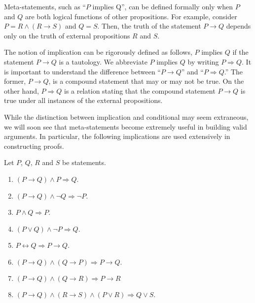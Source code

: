 Meta-statements, such as ``$P$ implies Q'', can be defined formally only when $P$ and $Q$ are both logical functions of other propositions.
For example, consider $P=R \wedge (R \to S)$ and $Q=S$.
Then, the truth of the statement $P \to Q$ depends only on the truth of external propositions $R$ and $S$.

The notion of implication can be rigorously defined as follows, $P$ implies $Q$ if the statement $P \rightarrow Q$ is a tautology.
We abbreviate $P$ implies $Q$ by writing $P \Rightarrow Q$.
It is important to understand the difference between ``$P \rightarrow Q$'' and ``$P \Rightarrow Q$.''
The former, $P \rightarrow Q$, is a compound statement that may or may not be true.
On the other hand, $P \Rightarrow Q$ is a relation stating that the compound statement $P \rightarrow Q$ is true under all instances of the external propositions.

While the distinction between implication and conditional may seem extraneous, we will soon see that meta-statements become extremely useful in building valid arguments.
In particular, the following implications are used extensively in constructing proofs.
\begin{fact}
Let $P$, $Q$, $R$ and $S$ be statements.
\begin{enumerate}
\item $(P \rightarrow Q) \wedge P \Rightarrow Q$.
\item $(P \rightarrow Q) \wedge \neg Q \Rightarrow \neg P$.
\item $P \wedge Q \Rightarrow P$.
\item $(P \vee Q) \wedge \neg P \Rightarrow Q$.
\item $P \leftrightarrow Q \Rightarrow P \rightarrow Q$.
\item $(P \rightarrow Q) \wedge (Q \rightarrow P) \Rightarrow P \rightarrow Q$.
\item $(P \rightarrow Q) \wedge (Q \rightarrow R) \Rightarrow P \rightarrow R$
\item $(P \rightarrow Q) \wedge (R \rightarrow S) \wedge (P \vee R) \Rightarrow Q \vee S$.
\end{enumerate}
\end{fact}

